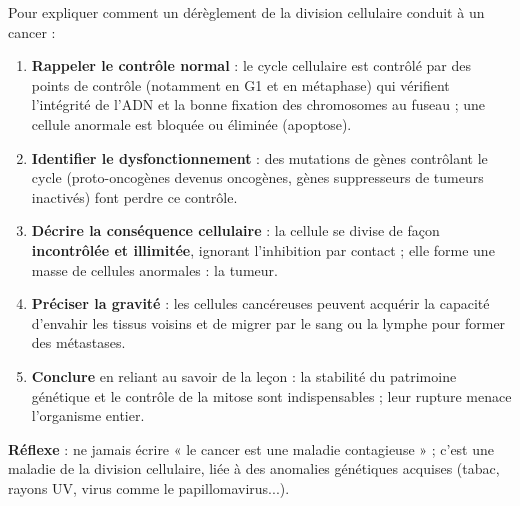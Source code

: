 \documentclass[11pt]{article}
\newcommand{\cle}[1]{{\popxbold\color{popdark}#1}}
\begin{document}
\begin{methode}
Pour expliquer comment un dérèglement de la division cellulaire conduit à un cancer :
\begin{enumerate}
\item \textbf{Rappeler le contrôle normal} : le cycle cellulaire est contrôlé par des points de contrôle (notamment en G1 et en métaphase) qui vérifient l'intégrité de l'ADN et la bonne fixation des chromosomes au fuseau ; une cellule anormale est bloquée ou éliminée (apoptose).
\item \textbf{Identifier le dysfonctionnement} : des \cle{mutations} de gènes contrôlant le cycle (proto-oncogènes devenus oncogènes, gènes suppresseurs de tumeurs inactivés) font perdre ce contrôle.
\item \textbf{Décrire la conséquence cellulaire} : la cellule se divise de façon \textbf{incontrôlée et illimitée}, ignorant l'inhibition par contact ; elle forme une masse de cellules anormales : la \cle{tumeur}.
\item \textbf{Préciser la gravité} : les cellules cancéreuses peuvent acquérir la capacité d'envahir les tissus voisins et de migrer par le sang ou la lymphe pour former des \cle{métastases}.
\item \textbf{Conclure} en reliant au savoir de la leçon : la stabilité du patrimoine génétique et le contrôle de la mitose sont indispensables ; leur rupture menace l'organisme entier.
\end{enumerate}
\textbf{Réflexe} : ne jamais écrire « le cancer est une maladie contagieuse » ; c'est une maladie de la division cellulaire, liée à des anomalies génétiques acquises (tabac, rayons UV, virus comme le papillomavirus...).
\end{methode}
\end{document}

